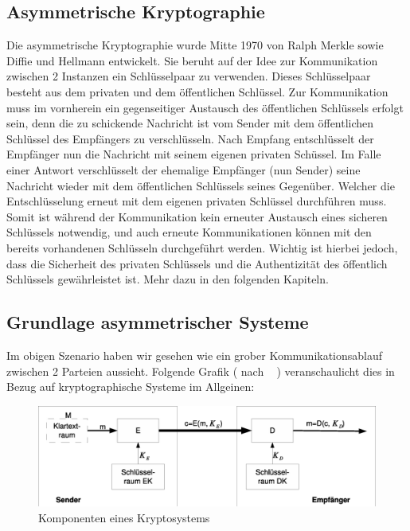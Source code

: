 \documentclass[paper=a4,11pt,german]{scrartcl} %
\begin{document}
\subsection{Asymmetrische Kryptographie}
Die asymmetrische Kryptographie wurde Mitte 1970 von Ralph Merkle sowie Diffie und Hellmann entwickelt. Sie beruht auf der Idee zur Kommunikation zwischen 2 Instanzen ein Schlüsselpaar zu verwenden. Dieses Schlüsselpaar besteht aus dem privaten und dem öffentlichen Schlüssel. Zur Kommunikation muss im vornherein ein gegenseitiger Austausch des öffentlichen Schlüssels erfolgt sein, denn die zu schickende Nachricht ist vom Sender mit dem öffentlichen Schlüssel des Empfängers zu verschlüsseln. Nach Empfang entschlüsselt der Empfänger nun die Nachricht mit seinem eigenen privaten Schüssel. Im Falle einer Antwort verschlüsselt der ehemalige Empfänger (nun Sender) seine Nachricht wieder mit dem öffentlichen Schlüssels seines Gegenüber. Welcher die Entschlüsselung erneut mit dem eigenen privaten Schlüssel durchführen muss. Somit ist während der Kommunikation kein erneuter Austausch eines sicheren Schlüssels notwendig, und auch erneute Kommunikationen können mit den bereits vorhandenen Schlüsseln durchgeführt werden. Wichtig ist hierbei jedoch, dass die Sicherheit des privaten Schlüssels und die Authentizität des öffentlich Schlüssels gewährleistet ist. Mehr dazu in den folgenden Kapiteln.
 
\subsection{Grundlage asymmetrischer Systeme}
Im obigen Szenario haben wir gesehen wie ein grober Kommunikationsablauf zwischen 2 Parteien aussieht. Folgende Grafik ( nach ~\cite{Eckert13} ) veranschaulicht dies in Bezug auf kryptographische Systeme im Allgeinen:

\begin{figure}[htb]
	\centering
	\includegraphics[width=\textwidth]{async.eps}
	\caption{Komponenten eines Kryptosystems}
	\label{fig:sim}
\end{figure}
\end{document}
